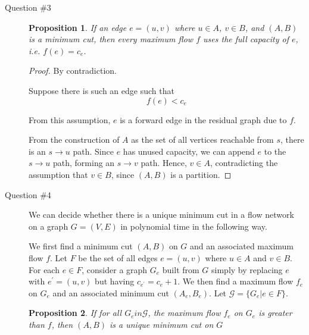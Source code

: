 \documentclass[letterpaper,11pt]{article}
\newtheorem{proposition}{Proposition}
\begin{document}
\begin{description}
    \item[Question \#3]

        \begin{proposition}
            If an edge $e = (u, v)$ where $u \in A$, $v \in B$, and $(A, B)$ is
            a minimum cut, then every maximum flow $f$ uses the full capacity
            of $e$, i.e. $f(e) = c_e$.
        \end{proposition}

        \begin{proof}
            By contradiction.

            Suppose there is such an edge such that
            \begin{equation}
                f(e) < c_e
                \label{eq:max-flow-contradiction}
            \end{equation}

            From this assumption, $e$ is a forward edge in the residual graph
            due to $f$.

            From the construction of $A$ as the set of all vertices reachable
            from $s$, there is an $s \to u$ path. Since $e$ has unused
            capacity, we can append $e$ to the $s \to u$ path, forming an $s
            \to v$ path. Hence, $v \in A$, contradicting the assumption that
            $v \in B$, since $(A, B)$ is a partition.
        \end{proof}

    \item[Question \#4]

        We can decide whether there is a unique minimum cut in a flow network
        on a graph $G = (V, E)$ in polynomial time in the following way.

        We first find a minimum cut $(A, B)$ on $G$ and an associated maximum
        flow $f$. Let $F$ be the set of all edges $e = (u, v)$ where $u \in A$
        and $v \in B$. For each $e \in F$, consider a graph $G_e$ built
        from $G$ simply by replacing $e$ with $e^\prime = (u, v)$ but having
        $c_{e^\prime} = c_e + 1$. We then find a maximum flow $f_e$ on
        $G_e$ and an associated minimum cut $(A_e, B_e)$. Let
        $\mathcal{G} = \{ G_e | e \in F \}$.

        \begin{proposition}
            If for all $G_e in \mathcal{G}$, the maximum flow $f_e$ on $G_e$ is
            greater than $f$, then $(A, B)$ is a unique minimum cut on $G$
        \end{proposition}


\end{description}
\end{document}
